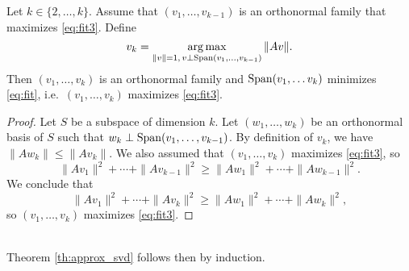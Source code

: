 \documentclass[11pt,nocut]{article}
\begin{document}
\begin{lemma}\label{lem:svd_rec}
	Let $k \in \{2, \dots, k\}$. Assume that $(v_1, \dots, v_{k-1})$ is an orthonormal family that maximizes \eqref{eq:fit3}.
	Define 
	$$
	v_k = \operatorname*{arg\,max}_{\|v\| = 1, \, v \perp {{\rm Span}}(v_1, \dots, v_{k-1})} \|Av\|.
	$$
	Then $(v_1, \dots, v_{k})$ is an orthonormal family and ${{\rm Span}}(v_1, \dots v_k)$ minimizes \eqref{eq:fit}, i.e.\ $(v_1, \dots, v_{k})$ maximizes \eqref{eq:fit3}.
\end{lemma}
\begin{proof}
	Let $S$ be a subspace of dimension $k$. Let $(w_1, \dots, w_k)$ be an orthonormal basis of $S$ such that $w_{k} \perp {{\rm Span}}(v_1, \dots, v_{k-1})$. By definition of $v_k$,
	we have $\|A w_k \| \leq \| A v_k\|$. 
	We also assumed that $(v_1, \dots, v_k)$ maximizes \eqref{eq:fit3}, so
	$$
	\|A v_1\|^2 + \cdots + \| A v_{k-1} \|^2 \geq
	\|A w_1\|^2 + \cdots+ \| A w_{k-1} \|^2.
	$$
	We conclude that
	$$
	\|A v_1\|^2 + \cdots + \| A v_{k} \|^2 \geq
	\|A w_1\|^2 + \cdots + \| A w_{k} \|^2,
	$$
	so $(v_1, \dots, v_k)$ maximizes \eqref{eq:fit3}.
\end{proof}
\\

Theorem \ref{th:approx_svd} follows then by induction.


\vspace{1cm}
\centerline{}

%
%
\end{document}
